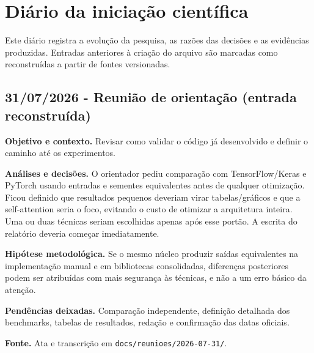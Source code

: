

\chapter{Diário da iniciação científica}





Este diário registra a evolução da pesquisa, as razões das decisões e as evidências produzidas. Entradas anteriores à criação do arquivo são marcadas como reconstruídas a partir de fontes versionadas.



\section{31/07/2026 - Reunião de orientação (entrada reconstruída)}




\textbf{Objetivo e contexto.} Revisar como validar o código já desenvolvido e definir o caminho até os experimentos.








\textbf{Análises e decisões.} O orientador pediu comparação com TensorFlow/Keras e PyTorch usando entradas e sementes equivalentes antes de qualquer otimização. Ficou definido que resultados pequenos deveriam virar tabelas/gráficos e que a self-attention seria o foco, evitando o custo de otimizar a arquitetura inteira. Uma ou duas técnicas seriam escolhidas apenas após esse portão. A escrita do relatório deveria começar imediatamente.






\textbf{Hipótese metodológica.} Se o mesmo núcleo produzir saídas equivalentes na implementação manual e em bibliotecas consolidadas, diferenças posteriores podem ser atribuídas com mais segurança às técnicas, e não a um erro básico da atenção.




\textbf{Pendências deixadas.} Comparação independente, definição detalhada dos benchmarks, tabelas de resultados, redação e confirmação das datas oficiais.



\textbf{Fonte.} Ata e transcrição em \texttt{docs/\allowbreak{}reunioes/\allowbreak{}2026-07-31/\allowbreak{}}.



